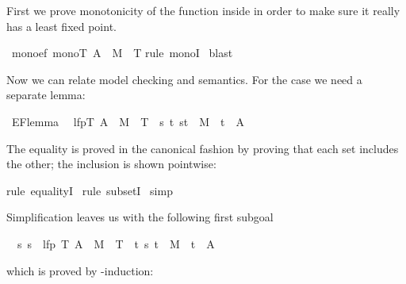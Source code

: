 \begin{isabellebody}
\begin{isamarkuptext}
First we prove monotonicity of the function inside 
in order to make sure it really has a least fixed point.%
\end{isamarkuptext}%
\ mono{\isacharunderscore}ef{\isacharcolon}\ {\isachardoublequote}mono{\isacharparenleft}{\isasymlambda}T{\isachardot}\ A\ {\isasymunion}\ {\isacharparenleft}M{\isasyminverse}\ {\isacharbackquote}{\isacharbackquote}\ T{\isacharparenright}{\isacharparenright}{\isachardoublequote}\isanewline
{}rule\ monoI{\isacharparenright}\isanewline
{}\ blast\isanewline
{}%
\begin{isamarkuptext}%
\noindent
Now we can relate model checking and semantics. For the  case we need
a separate lemma:%
\end{isamarkuptext}%
\ EF{\isacharunderscore}lemma{\isacharcolon}\isanewline
\ \ {\isachardoublequote}lfp{\isacharparenleft}{\isasymlambda}T{\isachardot}\ A\ {\isasymunion}\ {\isacharparenleft}M{\isasyminverse}\ {\isacharbackquote}{\isacharbackquote}\ T{\isacharparenright}{\isacharparenright}\ {\isacharequal}\ {\isacharbraceleft}s{\isachardot}\ {\isasymexists}t{\isachardot}\ {\isacharparenleft}s{\isacharcomma}t{\isacharparenright}\ {\isasymin}\ M\isactrlsup {\isacharasterisk}\ {\isasymand}\ t\ {\isasymin}\ A{\isacharbraceright}{\isachardoublequote}%
\begin{isamarkuptxt}%
\noindent
The equality is proved in the canonical fashion by proving that each set
includes the other; the inclusion is shown pointwise:%
\end{isamarkuptxt}%
rule\ equalityI{\isacharparenright}\isanewline
\ rule\ subsetI{\isacharparenright}\isanewline
\ simp{\isacharparenright}%
\begin{isamarkuptxt}%
\noindent
Simplification leaves us with the following first subgoal
\begin{isabelle}%
\ {}{\isachardot}\ {\isasymAnd}s{\isachardot}\ s\ {\isasymin}\ lfp\ {\isacharparenleft}{\isasymlambda}T{\isachardot}\ A\ {\isasymunion}\ M{\isasyminverse}\ {\isacharbackquote}{\isacharbackquote}\ T{\isacharparenright}\ {\isasymLongrightarrow}\ {\isasymexists}t{\isachardot}\ {\isacharparenleft}s{\isacharcomma}\ t{\isacharparenright}\ {\isasymin}\ M\isactrlsup {\isacharasterisk}\ {\isasymand}\ t\ {\isasymin}\ A%
\end{isabelle}
which is proved by -induction:%

\end{isamarkuptxt}
\end{isabellebody}
